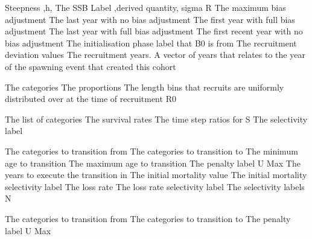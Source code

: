  {Steepness ,h,}
 {The SSB Label ,derived quantity,}
 {sigma R}
 {The maximum bias adjustment}
 {The last year with no bias adjustment}
 {The first year with full bias adjustment}
 {The last year with full bias adjustment}
 {The first recent year with no bias adjustment}
 {The initialisation phase label that B0 is from}
 {The recruitment deviation values}
 {The recruitment years. A vector of years that relates to the year of the spawning event that created this cohort}
\par\textbf{}\par
{} {The categories}
 {The proportions}
 {The length bins that recruits are uniformly distributed over at the time of recruitment}
 {R0}
\par\textbf{}\par
{} {The list of categories}
 {The survival rates}
 {The time step ratios for S}
 {The selectivity label}
\par\textbf{}\par
{} {The categories to transition from}
 {The categories to transition to}
 {The minimum age to transition}
 {The maximum age to transition}
 {The penalty label}
 {U Max}
 {The years to execute the transition in}
 {The initial mortality value}
 {The initial mortality selectivity label}
 {The loss rate}
 {The loss rate selectivity label}
 {The selectivity labels}
 {N}
\par\textbf{}\par
{} {The categories to transition from}
 {The categories to transition to}
 {The penalty label}
 {U Max}
 {}
 {}
